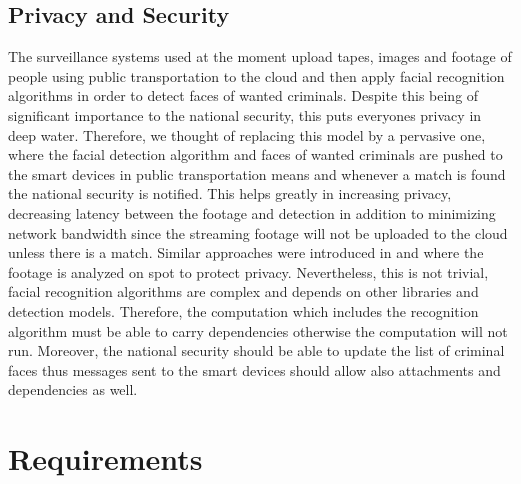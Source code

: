\subsection{Privacy and Security}
The surveillance systems used at the moment upload  tapes, images and footage of people using public transportation to the cloud and then apply facial recognition algorithms in order to  detect faces of wanted criminals. Despite this being of  significant importance to the national security, this puts everyones privacy in deep water. Therefore, we thought of replacing this model by a pervasive one, where  the facial detection algorithm and faces of  wanted criminals are pushed to the smart devices in public transportation means and whenever a match is found the national security is notified. This helps greatly in increasing privacy, decreasing  latency between the footage and detection in addition to minimizing network bandwidth since the streaming footage  will not be uploaded to the cloud unless there is a match. Similar approaches were introduced in \cite{4653063} and \cite{winkler2010trustcam} where the footage is analyzed on spot to protect privacy. Nevertheless, this is not trivial, facial recognition algorithms are complex and depends on other libraries and  detection models. Therefore, the computation which includes the recognition algorithm  must be able to carry dependencies otherwise the computation will not run. Moreover, the national security should be able to update the list of criminal faces thus messages sent to the smart devices should allow also attachments and dependencies as well. 


\section{Requirements} \label{sec:requirements}

